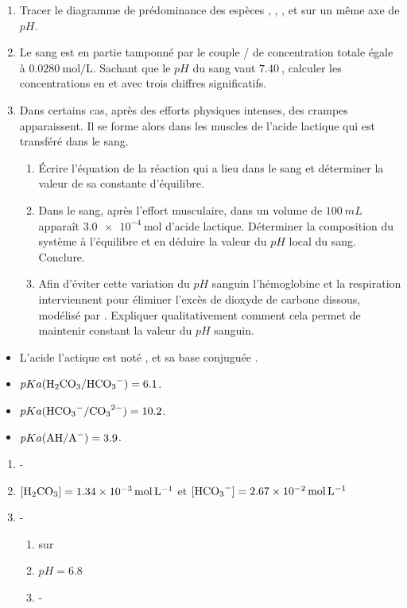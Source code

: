 \begin{enumerate}
	\item Tracer le diagramme de prédominance des espèces , , ,  et  sur un même axe de $pH$.
	\item Le sang est en partie tamponné par le couple / de concentration totale égale à $\SI{0.0280}{\mol\per\liter}$. Sachant que le $pH$ du sang vaut $\SI{7.40}{}$, calculer les concentrations en  et  avec trois chiffres significatifs.
	\item Dans certains cas, après des efforts physiques intenses, des crampes apparaissent. Il se forme alors dans les muscles de l'acide lactique  qui est transféré dans le sang.
	\begin{enumerate}
		\item Écrire l'équation de la réaction qui a lieu dans le sang et déterminer la valeur de sa constante d'équilibre.
		\item Dans le sang, après l'effort musculaire, dans un volume de $\SI{100}{mL}$ apparaît $\SI{3.0e-4}{\mol}$ d'acide lactique. Déterminer la composition du système à l'équilibre et en déduire la valeur du $pH$ local du sang. Conclure.
		\item Afin d'éviter cette variation du $pH$ sanguin l'hémoglobine et la respiration interviennent pour éliminer l'excès de dioxyde de carbone dissous, modélisé par . Expliquer qualitativement comment cela permet de maintenir constant la valeur du $pH$ sanguin. 
	\end{enumerate}
\end{enumerate}

\begin{itemize}
	\item L'acide l'actique est noté , et sa base conjuguée .
	\item $pKa(\ce{H2CO3}/\ce{HCO3-}) = \SI{6.1}{}$.
	\item $pKa(\ce{HCO3-}/\ce{CO3^{2-}}) = \SI{10.2}{}$.
	\item $pKa(\ce{AH}/\ce{A-}) = \SI{3.9}{}$.
\end{itemize}

\begin{enumerate}
	\item -
	\item $[\ce{H2CO3}] = \SI{1.34e-3}{\mol\per\liter}$ et $[\ce{HCO3-}] = \SI{2.67e-2}{\mol\per\liter}$
	\item -
	\begin{enumerate}
		\item {} sur 
		\item $pH = 6.8$
		\item -
	\end{enumerate}
\end{enumerate}

